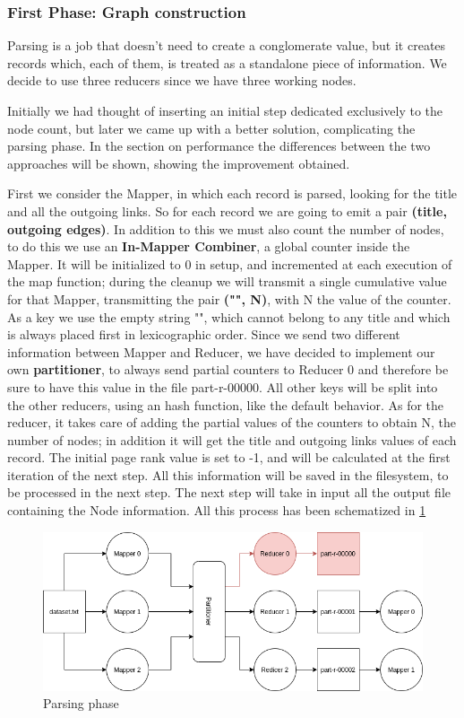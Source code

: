 \subsubsection{First Phase: Graph construction}
Parsing is a job that doesn't need to create a conglomerate value, but it creates records which, each of them, is treated as a standalone piece of information. We decide to use three reducers since we have three working nodes.

\noindent Initially we had thought of inserting an initial step dedicated exclusively to the node count, but later we came up with a better solution, complicating the parsing phase. In the section on performance the differences between the two approaches will be shown, showing the improvement obtained.

\noindent First we consider the Mapper, in which each record is parsed, looking for the title and all the outgoing links. So for each record we are going to emit a pair \textbf{(title, outgoing edges)}. In addition to this we must also count the number of nodes, to do this we use an \textbf{In-Mapper Combiner}, a global counter inside the Mapper. It will be initialized to 0 in setup, and incremented at each execution of the map function; during the cleanup we will transmit a single cumulative value for that Mapper, transmitting the pair \textbf{("", N)}, with N the value of the counter. As a key we use the empty string "", which cannot belong to any title and which is always placed first in lexicographic order.
Since we send two different information between Mapper and Reducer, we have decided to implement our own \textbf{partitioner}, to always send partial counters to Reducer 0 and therefore be sure to have this value in the file part-r-00000. All other keys will be split into the other reducers, using an hash function, like the default behavior.
As for the reducer, it takes care of adding the partial values of the counters to obtain N, the number of nodes; in addition it will get the title and outgoing links values of each record. The initial page rank value is set to -1, and will be calculated at the first iteration of the next step. All this information will be saved in the filesystem, to be processed in the next step. The next step will take in input all the output file containing the Node information. All this process has been schematized in \ref{fig:parsingPhase}


\begin{figure}[H]
	\includegraphics[width=\textwidth]{img/ParserSchema.png}
	\caption{Parsing phase}
	\label{fig:parsingPhase}     
\end{figure}

